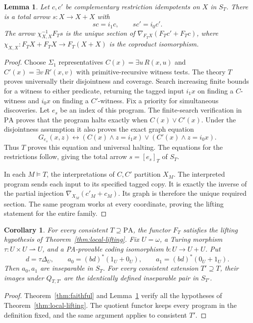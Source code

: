 \documentclass[11pt]{article}
\newtheorem{lemma}[theorem]{Lemma}
\newtheorem{corollary}[theorem]{Corollary}
\newcommand{\PA}{\mathrm{PA}}
\begin{document}
\begin{lemma}\label{lem:switch}
Let $c,c'$ be complementary restriction idempotents on $X$ in $S_T$.
There is a total arrow $s:X\to X+X$ with
\[
 sc=i_1c,\qquad sc'=i_0c'.
\]
The arrow $\chi_{X,X}^{-1}F_Ts$ is the unique section of
$\nabla_{F_TX}(F_Tc'+F_Tc)$, where
$\chi_{X,X}:F_TX+F_TX\to F_T(X+X)$ is the coproduct isomorphism.
\end{lemma}
\begin{proof}
Choose $\Sigma_1$ representatives $C(x)=\exists u\,R(x,u)$ and
$C'(x)=\exists v\,R'(x,v)$ with primitive-recursive witness tests.
The theory $T$ proves universally their disjointness and coverage.
Search increasing finite bounds for a witness to either predicate,
returning the tagged input $i_1x$ on finding a $C$-witness and $i_0x$
on finding a $C'$-witness. Fix a priority for simultaneous discoveries.
Let $e_s$ be an index of this program. The finite-search verification
in $\PA$ proves that the program halts
exactly when $C(x)\lor C'(x)$. Under the disjointness assumption it also
proves the exact graph equation
\[
 G_{e_s}(x,z)\leftrightarrow
 (C(x)\land z=i_1x)\lor(C'(x)\land z=i_0x).
\]
Thus $T$ proves this equation and universal halting. The equations for
the restrictions follow, giving the total arrow $s=[e_s]_T$ of $S_T$.

In each $M\models T$, the interpretations of $C,C'$ partition $X_M$.
The interpreted program sends each input to its specified tagged copy.
It is exactly the inverse of the partial injection
$\nabla_{X_M}(c'_M+c_M)$. Its graph is therefore the unique required
section. The same program works at every coordinate, proving the lifting
statement for the entire family.
\end{proof}

\begin{corollary}\label{cor:pair}
For every consistent $T\supseteq\PA$, the functor $F_T$ satisfies the
lifting hypothesis of Theorem~\ref{thm:local-lifting}.
Fix $U=\omega$, a Turing morphism $\tau:U\times U\rightharpoonup U$,
and a PA-provable coding isomorphism $b:U\to U+U$. Put
\[
 d=\tau\Delta_U,\qquad
 a_0=(bd)^*(1_U+0_U),\qquad a_1=(bd)^*(0_U+1_U).
\]
Then $a_0,a_1$ are inseparable in $S_T$. For every consistent
extension $T'\supseteq T$, their images under $Q_{T,T'}$ are the
identically defined inseparable pair in $S_{T'}$.
\end{corollary}
\begin{proof}
Theorem~\ref{thm:faithful} and Lemma~\ref{lem:switch} verify all the
hypotheses of Theorem~\ref{thm:local-lifting}. The quotient functor keeps
every program in the definition fixed, and the same argument applies
to consistent $T'$.
\end{proof}
\end{document}

